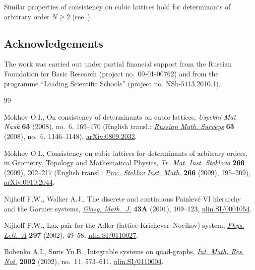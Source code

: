 \documentclass[pdftex]{sigma}
\begin{document}
Similar properties of consistency on cubic lattices hold for
determinants of arbitrary order $N \geq 2$ (see~\cite{1, 2}).



\subsection*{Acknowledgements}


The work was carried out under partial
f\/inancial support from the Russian Foundation for Basic Research
(project no.~09-01-00762) and from the programme ``Leading
Scientif\/ic Schools'' (project no. NSh-5413.2010.1).

\begin{thebibliography}{99}

\footnotesize\itemsep=0pt


Mokhov O.I.,
On consistency of determinants on cubic lattices,
{\it Uspekhi Mat. Nauk} {\bf 63} (2008), no.~6, 169--170
(English transl.: \href{http://dx.doi.org/10.1070/RM2008v063n06ABEH004586}{{\it Russian Math. Surveys}} {\bf 63} (2008), no.~6, 1146--1148),
\href{http://arxiv.org/abs/0809.2032}{arXiv:0809.2032}.


Mokhov O.I.,
Consistency on cubic lattices for determinants of
arbitrary orders, in Geometry, Topology and Mathematical Physics,
{\it Tr. Mat. Inst. Steklova} {\bf 266} (2009),
202--217 (English transl.: \href{http://dx.doi.org/10.1134/S0081543809030110}{{\it Proc. Steklov Inst. Math.}} {\bf 266} (2009), 195--209),
\href{http://arxiv.org/abs/0910.2044}{arXiv:0910.2044}.


Nijhof\/f F.W., Walker A.J.,
The discrete and continuous Painlev\'e VI hierarchy and the Garnier systems,
\href{http://dx.doi.org/10.1017/S0017089501000106}{{\it Glasg. Math.~J.}} {\bf 43A} (2001), 109--123,
\href{http://arxiv.org/abs/nlin.SI/0001054}{nlin.SI/0001054}.


Nijhof\/f F.W.,
Lax pair for the Adler (lattice Krichever--Novikov) system,
\href{http://dx.doi.org/10.1016/S0375-9601(02)00287-6}{{\it Phys. Lett.~A}} {\bf 297} (2002), 49--58,
\href{http://arxiv.org/abs/nlin.SI/0110027}{nlin.SI/0110027}.


Bobenko A.I., Suris Yu.B.,
Integrable systems on quad-graphs,
\href{http://dx.doi.org/10.1155/S1073792802110075}{{\it Int. Math. Res. Not.}} {\bf 2002} (2002), no.~11, 573--611,
\href{http://arxiv.org/abs/nlin.SI/0110004}{nlin.SI/0110004}.



\end{thebibliography}
\end{document}
